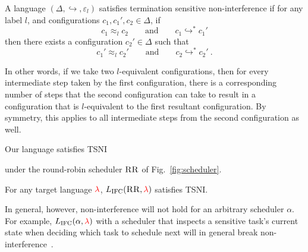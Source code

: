 \documentclass{llncs}
\newif\ifextended
\newcommand{\Red}[1]{{\color{red} #1}}
\begin{document}
\begin{definition}
  A language \ensuremath{(\Delta,\hookrightarrow,\varepsilon_{l})} satisfies termination
  sensitive non-interference if for any label \ensuremath{l}, and configurations
  $\ensuremath{c_{1},c_{1}',c_{2}}\in\ensuremath{\Delta}$, if
  \begin{equation} \label{eq:tsni-lhs}
    \ensuremath{c_{1}} \approx_{\ensuremath{l}} \ensuremath{c_{2}}
    \qquad \text{and} \qquad
    \ensuremath{c_{1}} \ensuremath{\hookrightarrow}^* \ensuremath{c_{1}'}
  \end{equation}
  then there exists a configuration $\ensuremath{c_{2}'}\in\ensuremath{\Delta}$ such that
  \begin{equation} \label{eq:tsni-rhs}
    \ensuremath{c_{1}'} \approx_{\ensuremath{l}} \ensuremath{c_{2}'}
     \qquad \text{and} \qquad
    \ensuremath{c_{2}} \ensuremath{\hookrightarrow}^* \ensuremath{c_{2}'}
    \ \text{.}
  \end{equation}
\end{definition}
In other words, if we take two \ensuremath{l}-equivalent configurations, then for every
intermediate step taken by the first configuration, there is a corresponding
number of steps that the second configuration can take to result in a
configuration that is \ensuremath{l}-equivalent to the first resultant configuration.
By symmetry, this applies to all intermediate steps from the second configuration
as well.
\ifextended
We remark that this notion of non-interfernce is similar to
\emph{progress sensitive non-interference (PSNI)}, which accounts for
leakage via progress (or termination) channels, as used for static
systems~\cite{moore2012precise}.
\fi


Our language satisfies TSNI 
\ifextended
(and thus PSNI)
\fi
under the round-robin scheduler
\ensuremath{\textsc{RR}} of Fig.~\ref{fig:scheduler}.
\begin{theorem}
  \label{thm:rr-tsni}
For any target language \ensuremath{\Red{\lambda}}, \ensuremath{L_\text{IFC}(\textsc{RR},\Red{\lambda})} satisfies TSNI.
\end{theorem}

In general, however, non-interference will not hold for an arbitrary scheduler \ensuremath{\alpha}.
For example, \ensuremath{L_\text{IFC}(\alpha,\Red{\lambda})} with a scheduler that inspects a
sensitive task's current state when deciding which task to schedule next
will in general break non-interference~\cite{russo2006securing,BartheRRS07}.
\end{document}
